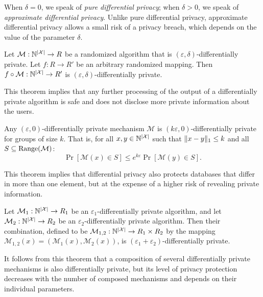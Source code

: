 When $\delta = 0$, we speak of \emph{pure differential privacy}; when $\delta > 0$, we speak of \emph{approximate differential privacy}. Unlike pure differential privacy, approximate differential privacy allows a small risk of a privacy breach, which depends on the value of the parameter $\delta$.

\begin{theorem}
Let $\mathcal{M} : \mathbb{N}^{\lvert\mathcal{X}\rvert} \rightarrow R$ be a randomized algorithm that is $(\varepsilon, \delta)$-differentially private. Let $f : R \rightarrow R'$ be an arbitrary randomized mapping. Then $f \circ \mathcal{M} : \mathbb{N}^{\lvert\mathcal{X}\rvert} \rightarrow R'$ is $(\varepsilon, \delta)$-differentially private.
\end{theorem}

This theorem implies that any further processing of the output of a differentially private algorithm is safe and does not disclose more private information about the users.

\begin{theorem}
Any $(\varepsilon, 0)$-differentially private mechanism $\mathcal{M}$ is $(k\varepsilon, 0)$-differentially private for groups of size $k$. That is, for all $x, y \in \mathbb{N}^{\lvert\mathcal{X}\rvert}$ such that $\lVert x - y\rVert_1 \leq k$ and all $S \subseteq \operatorname{Range}(\mathcal{M})$:
\[
\Pr[\mathcal{M}(x) \in S] \leq e^{k\varepsilon} \Pr[\mathcal{M}(y) \in S].
\]
\end{theorem}

This theorem implies that differential privacy also protects databases that differ in more than one element, but at the expense of a higher risk of revealing private information.

\begin{theorem}
\label{thm:basic_composition}
Let $\mathcal{M}_1 : \mathbb{N}^{\lvert\mathcal{X}\rvert} \rightarrow R_1$ be an $\varepsilon_1$-differentially private algorithm, and let $\mathcal{M}_2 : \mathbb{N}^{\lvert\mathcal{X}\rvert} \rightarrow R_2$ be an $\varepsilon_2$-differentially private algorithm. Then their combination, defined to be $\mathcal{M}_{1,2} : \mathbb{N}^{\lvert\mathcal{X}\rvert} \rightarrow R_1 \times R_2$ by the mapping $\mathcal{M}_{1,2}(x) = (\mathcal{M}_1(x), \mathcal{M}_2(x))$, is $(\varepsilon_1 + \varepsilon_2)$-differentially private.
\end{theorem}

It follows from this theorem that a composition of several differentially private mechanisms is also differentially private, but its level of privacy protection decreases with the number of composed mechanisms and depends on their individual parameters.

